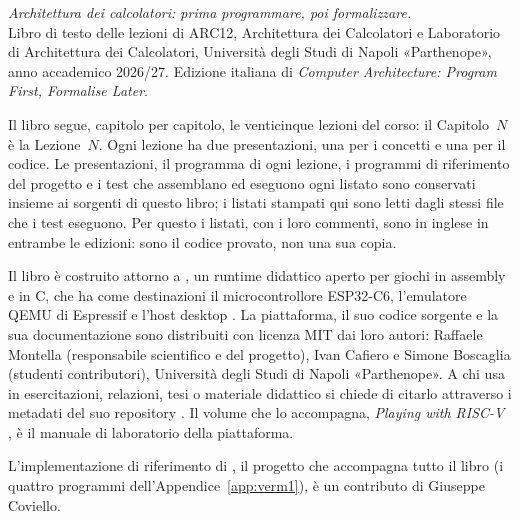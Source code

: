 \thispagestyle{empty}
\vspace*{\fill}
\noindent
{\small
\textit{Architettura dei calcolatori: prima programmare, poi formalizzare.}\\
Libro di testo delle lezioni di ARC12, Architettura dei Calcolatori e
Laboratorio di Architettura dei Calcolatori, Università degli Studi di Napoli
«Parthenope», anno accademico 2026/27. Edizione italiana di \emph{Computer
Architecture: Program First, Formalise Later}.\par
\vspace{1em}

\noindent
Il libro segue, capitolo per capitolo, le venticinque lezioni del corso: il
Capitolo~$N$ è la Lezione~$N$. Ogni lezione ha due presentazioni, una per i
concetti e una per il codice. Le presentazioni, il programma di ogni lezione, i
programmi di riferimento
del progetto \vermone e i test che assemblano ed eseguono ogni listato sono
conservati insieme ai sorgenti di questo libro; i listati stampati qui sono
letti dagli stessi file che i test eseguono. Per questo i listati, con i loro
commenti, sono in inglese in entrambe le edizioni: sono il codice provato, non
una sua copia.\par
\vspace{1em}

\noindent
Il libro è costruito attorno a \prg, un runtime didattico aperto per giochi in
assembly \riscv e in C, che ha come destinazioni il microcontrollore
ESP32\nobreakdash-C6, l'emulatore QEMU di Espressif e l'host desktop \prgqt. La
piattaforma, il suo codice sorgente e la sua documentazione sono distribuiti
con licenza MIT dai loro autori: Raffaele Montella (responsabile scientifico e
del progetto), Ivan Cafiero e Simone Boscaglia (studenti contributori),
Università degli Studi di Napoli «Parthenope». A chi usa \prg in esercitazioni,
relazioni, tesi o materiale didattico si chiede di citarlo attraverso i
metadati  del suo repository \citep{prg32repo}. Il volume
che lo accompagna, \emph{Playing with RISC-V} \citep{prg32textbook}, è il
manuale di laboratorio della piattaforma.\par
\vspace{1em}

\noindent
L'implementazione di riferimento di \vermone, il progetto che accompagna
tutto il libro (i quattro programmi dell'Appendice~\ref{app:verm1}), è un
contributo di Giuseppe Coviello.\par
\vspace{1em}

}
